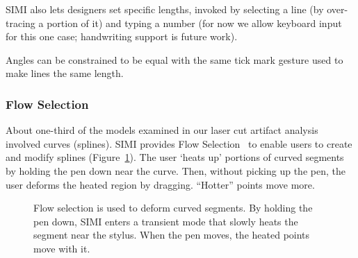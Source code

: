 \documentclass{article}
\begin{document}
SIMI also lets designers set specific lengths, invoked by selecting a
line (by over-tracing a portion of it) and typing a number (for now we
allow keyboard input for this one case; handwriting support is future
work). 

Angles can be constrained to be equal with the same tick mark gesture
used to make lines the same length.

\subsubsection{Flow Selection}


About one-third of the models examined in our laser cut artifact
analysis involved curves (splines). SIMI provides Flow
Selection~\cite{johnson-flow-selection} to enable users to create and
modify splines (Figure~\ref{fig:fs}). The user `heats up' portions of
curved segments by holding the pen down near the curve. Then, without
picking up the pen, the user deforms the heated region by
dragging. ``Hotter'' points move more.

\begin{figure}[h]
\centering {}
\hspace{3mm} 
\caption{Flow selection is used to deform curved segments. By holding
  the pen down, SIMI enters a transient mode that slowly heats the
  segment near the stylus. When the pen moves, the heated points move
  with it.}
\label{fig:fs}
\end{figure}
\end{document}
